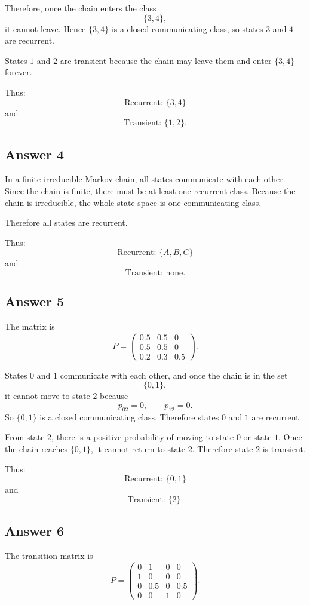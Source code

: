 \documentclass[12pt,a4paper]{article}
\theoremstyle{notestyle}
\begin{document}
Therefore, once the chain enters the class
\[
\{3,4\},
\]
it cannot leave. Hence $\{3,4\}$ is a closed communicating class, so states $3$ and $4$ are recurrent.

States $1$ and $2$ are transient because the chain may leave them and enter $\{3,4\}$ forever.

Thus:
\[
\boxed{\text{Recurrent: } \{3,4\}}
\]
and
\[
\boxed{\text{Transient: } \{1,2\}.}
\]

\subsection*{Answer 4}

In a finite irreducible Markov chain, all states communicate with each other. Since the chain is finite, there must be at least one recurrent class. Because the chain is irreducible, the whole state space is one communicating class.

Therefore all states are recurrent.

Thus:
\[
\boxed{\text{Recurrent: } \{A,B,C\}}
\]
and
\[
\boxed{\text{Transient: none}.}
\]

\subsection*{Answer 5}

The matrix is
\[
P=
\begin{pmatrix}
0.5 & 0.5 & 0\\
0.5 & 0.5 & 0\\
0.2 & 0.3 & 0.5
\end{pmatrix}.
\]

States $0$ and $1$ communicate with each other, and once the chain is in the set
\[
\{0,1\},
\]
it cannot move to state $2$ because
\[
p_{02}=0,\qquad p_{12}=0.
\]
So $\{0,1\}$ is a closed communicating class. Therefore states $0$ and $1$ are recurrent.

From state $2$, there is a positive probability of moving to state $0$ or state $1$. Once the chain reaches $\{0,1\}$, it cannot return to state $2$. Therefore state $2$ is transient.

Thus:
\[
\boxed{\text{Recurrent: } \{0,1\}}
\]
and
\[
\boxed{\text{Transient: } \{2\}.}
\]

\subsection*{Answer 6}

The transition matrix is
\[
P=
\begin{pmatrix}
0 & 1 & 0 & 0\\
1 & 0 & 0 & 0\\
0 & 0.5 & 0 & 0.5\\
0 & 0 & 1 & 0
\end{pmatrix}.
\]
\end{document}
